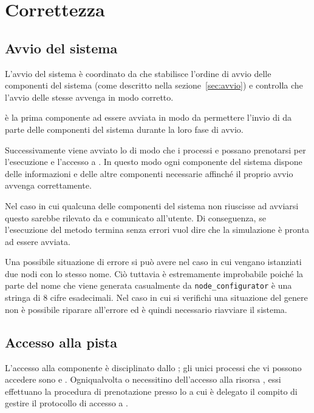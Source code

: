 \chapter{Correttezza}

\section{Avvio del sistema}
L'avvio del sistema è coordinato da \bootserv{} che stabilisce l'ordine di avvio delle componenti del sistema (come descritto nella sezione~\ref{sec:avvio}) e controlla che l'avvio delle stesse avvenga in modo corretto.

\evdisp{} è la prima componente ad essere avviata in modo da permettere l'invio di  da parte delle componenti del sistema durante la loro fase di avvio.

Successivamente viene avviato lo \sched{} di modo che i processi \weather{} e \car{} possano prenotarsi per l'esecuzione e l'accesso a \track{}. In questo modo ogni componente del sistema dispone delle informazioni e delle altre componenti necessarie affinché il proprio avvio avvenga correttamente.

Nel caso in cui qualcuna delle componenti del sistema non riuscisse ad avviarsi questo sarebbe rilevato da \bootserv{} e comunicato all'utente. Di conseguenza, se l'esecuzione del metodo  termina senza errori vuol dire che la simulazione è pronta ad essere avviata.

Una possibile situazione di errore si può avere nel caso in cui vengano istanziati due nodi \Erlang{} con lo stesso nome. Ciò tuttavia è estremamente improbabile poiché la parte del nome che viene generata casualmente da \texttt{node\_configurator} è una stringa di 8 cifre esadecimali. Nel caso in cui si verifichi una situazione del genere non è possibile riparare all'errore ed è quindi necessario riavviare il sistema.

\section{Accesso alla pista}
L'accesso alla componente \track{} è disciplinato dallo \sched{}; gli unici processi che vi possono accedere sono \car{} e \weather{}. Ogniqualvolta \car{} o \weather{} necessitino dell'accesso alla risorsa \track{}, essi effettuano la procedura di prenotazione presso lo \sched{} a cui è delegato il compito di gestire il protocollo di accesso a \track{}.

